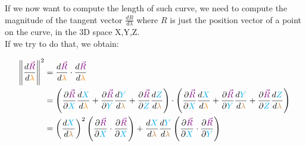 If we now want to compute the length of such curve, we need to compute the magnitude of the tangent vector $\frac{dR}{d\lambda}$ where $R$ is just
the position vector of a point on the curve, in the 3D space X,Y,Z.\\

If we try to do that, we obtain:

\begin{align*}
    \norm{\frac{d\begingroup\color{violet}\vec{R}\endgroup}{d\begingroup\color{orange}\lambda\endgroup}}^2 &=
    \frac{d\begingroup\color{violet}\vec{R}\endgroup}{d\begingroup\color{orange}\lambda\endgroup} \cdot \frac{d\begingroup\color{violet}\vec{R}\endgroup}{d\begingroup\color{orange}\lambda\endgroup}\\
    &= \left(\frac{\partial \begingroup\color{violet}\vec{R}\endgroup}{\partial \begingroup\color{cyan}X\endgroup} \frac{d \begingroup\color{cyan}X\endgroup}{d \begingroup\color{orange}\lambda\endgroup} + 
    \frac{\partial \begingroup\color{violet}\vec{R}\endgroup}{\partial \begingroup\color{cyan}Y\endgroup} \frac{d \begingroup\color{cyan}Y\endgroup}{d \begingroup\color{brown}\lambda\endgroup} + 
    \frac{\partial \begingroup\color{violet}\vec{R}\endgroup}{\partial \begingroup\color{cyan}Z\endgroup} \frac{d \begingroup\color{cyan}Z\endgroup}{d \begingroup\color{brown}\lambda\endgroup}\right) \cdot
    \left(\frac{\partial \begingroup\color{violet}\vec{R}\endgroup}{\partial \begingroup\color{cyan}X\endgroup} \frac{d \begingroup\color{cyan}X\endgroup}{d \begingroup\color{orange}\lambda\endgroup} + 
    \frac{\partial \begingroup\color{violet}\vec{R}\endgroup}{\partial \begingroup\color{cyan}Y\endgroup} \frac{d \begingroup\color{cyan}Y\endgroup}{d \begingroup\color{brown}\lambda\endgroup} + 
    \frac{\partial \begingroup\color{violet}\vec{R}\endgroup}{\partial \begingroup\color{cyan}Z\endgroup} \frac{d \begingroup\color{cyan}Z\endgroup}{d \begingroup\color{brown}\lambda\endgroup}\right)\\
    &= \left(\frac{d \begingroup\color{cyan}X\endgroup}{d \begingroup\color{brown}\lambda\endgroup}\right)^2 \left(\frac{\partial \begingroup\color{violet}\vec{R}\endgroup}{\partial \begingroup\color{cyan}X\endgroup} \cdot \frac{\partial \begingroup\color{violet}\vec{R}\endgroup}{\partial \begingroup\color{cyan}X\endgroup}\right)
    + \frac{d \begingroup\color{cyan}X\endgroup}{d \begingroup\color{brown}\lambda\endgroup} \frac{d \begingroup\color{cyan}Y\endgroup}{d \begingroup\color{brown}\lambda\endgroup}\left(\frac{\partial \begingroup\color{violet}\vec{R}\endgroup}{\partial \begingroup\color{cyan}X\endgroup} \cdot \frac{\partial \begingroup\color{violet}\vec{R}\endgroup}{\partial \begingroup\color{cyan}Y\endgroup}\right)

\end{align*}
